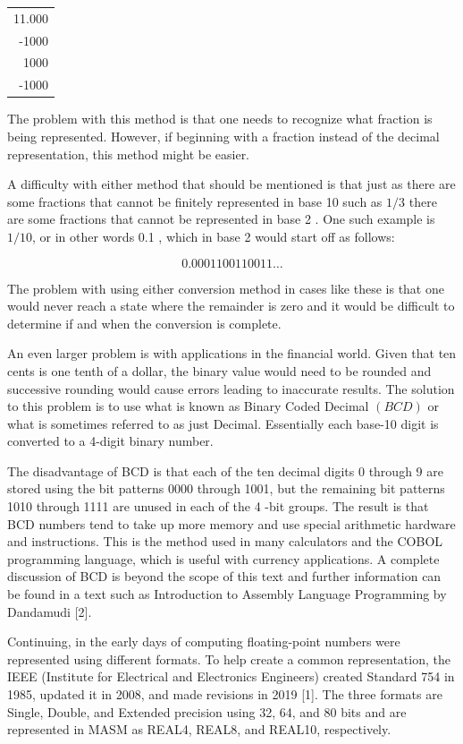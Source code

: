 \documentclass[10pt]{book}
\begin{document}
\begin{center}
\begin{tabular}{r}
11.000 \\
-1000 \\
\hline
1000 \\
-1000 \\
\hline
\end{tabular}
\end{center}

The problem with this method is that one needs to recognize what fraction is being represented. However, if beginning with a fraction instead of the decimal representation, this method might be easier.

A difficulty with either method that should be mentioned is that just as there are some fractions that cannot be finitely represented in base 10 such as $1 / 3$ there are some fractions that cannot be represented in base 2 . One such example is $1 / 10$, or in other words 0.1 , which in base 2 would start off as follows:

$$
0.0001100110011 \ldots
$$

The problem with using either conversion method in cases like these is that one would never reach a state where the remainder is zero and it would be difficult to determine if and when the conversion is complete.

An even larger problem is with applications in the financial world. Given that ten cents is one tenth of a dollar, the binary value would need to be rounded and successive rounding would cause errors leading to inaccurate results. The solution to this problem is to use what is known as Binary Coded Decimal $(B C D)$ or what is sometimes referred to as just Decimal. Essentially each base-10 digit is converted to a 4-digit binary number.

The disadvantage of BCD is that each of the ten decimal digits 0 through 9 are stored using the bit patterns 0000 through 1001, but the remaining bit patterns 1010 through 1111 are unused in each of the 4 -bit groups. The result is that BCD numbers tend to take up more memory and use special arithmetic hardware and instructions. This is the method used in many calculators and the COBOL programming language, which is useful with currency applications. A complete discussion of BCD is beyond the scope of this text and further information can be found in a text such as Introduction to Assembly Language Programming by Dandamudi [2].

Continuing, in the early days of computing floating-point numbers were represented using different formats. To help create a common representation, the IEEE (Institute for Electrical and Electronics Engineers) created Standard 754 in 1985, updated it in 2008, and made revisions in 2019 [1]. The three formats are Single, Double, and Extended precision using 32, 64, and 80 bits and are represented in MASM as REAL4, REAL8, and REAL10, respectively.
\end{document}
